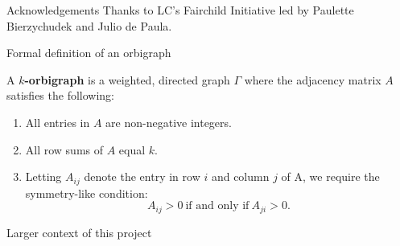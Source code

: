 \documentclass[final]{beamer}
\newlength{\onecolwid}
\begin{document}
\begin{frame}[t]
\begin{columns}[t]
\begin{column}{\onecolwid}


\begin{block}{Acknowledgements}
Thanks to LC's Fairchild Initiative led by Paulette Bierzychudek and Julio de Paula.
\end{block}


\begin{alertblock}{Formal definition of an orbigraph}
      
A \textbf{$k$-orbigraph} is a weighted, directed graph $\Gamma$ where the adjacency matrix $A$ satisfies the following:
    
    \begin{enumerate}
      \item All entries in $A$ are non-negative integers.
      \item All row sums of $A$ equal $k$.
      \item Letting $A_{ij}$ denote the entry in row $i$ and column $j$ of A, we require the symmetry-like condition: $$A_{ij} > 0  \ \text{if and only if} \  A_{ji} > 0.$$
    \end{enumerate}
\end{alertblock}



\begin{alertblock}{Larger context of this project}
      





\end{alertblock}
\end{column}
\end{columns}
\end{frame}
\end{document}

